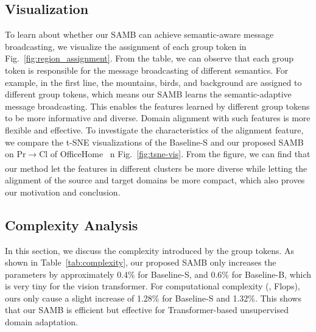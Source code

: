 \documentclass[journal]{IEEEtran}
\begin{document}
\subsection{Visualization}
\label{sec:vis}
To learn about whether our SAMB can achieve semantic-aware message broadcasting, we visualize the assignment of each group token in Fig.~\ref{fig:region_assignment}. From the table, we can observe that each group token is responsible for the message broadcasting of different semantics. For example, in the first line, the mountains, birds, and background are assigned to different group tokens, which means our SAMB learns the semantic-adaptive message broadcasting. This enables the features learned by different group tokens to be more informative and diverse.  Domain alignment with such features is more flexible and effective. To investigate the characteristics of the alignment feature, we compare the t-SNE visualizations of the Baseline-S and  our proposed SAMB on Pr$\xrightarrow[]{}$Cl of OfficeHome~\cite{venkateswara2017deepOffice-Home}  n Fig.~\ref{fig:tsne-vis}. From the figure, we can find that our method let the features in different clusters be more diverse while letting the alignment of the source and target domains be more compact, which also proves our motivation and conclusion.  



\subsection{Complexity Analysis}
\label{sec:complexity}
In this section, we discuss the complexity introduced by the group tokens. As shown in Table~\ref{tab:complexity}, our proposed SAMB only increases the parameters by approximately 0.4\% for Baseline-S, and 0.6\% for Baseline-B, which is very tiny for the vision transformer. For computational complexity (\ieno, Flops), ours only cause a slight increase of 1.28\% for Baseline-S and 1.32\%. This shows that our SAMB is efficient but effective for Transformer-based unsupervised domain adaptation.




\begin{table}[]
\caption{Complexity Analysis for our proposed SAMB.}
\label{tab:complexity}
\end{table}
\end{document}
